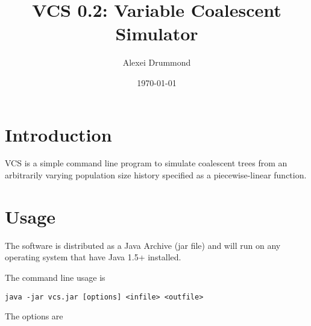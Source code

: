 \documentclass[12pt]{article}
\begin{document}
\title{VCS 0.2: Variable Coalescent Simulator}
\author{Alexei Drummond}
\date{\today{}}
\maketitle

\section*{Introduction}

VCS is a simple command line program to simulate coalescent trees from an arbitrarily varying population size history specified as a piecewise-linear function.

\section*{Usage}

The software is distributed as a Java Archive (jar file) and will run on any operating system that have Java 1.5+ installed.

The command line usage is

\begin{verbatim}
java -jar vcs.jar [options] <infile> <outfile>
\end{verbatim}

The options are
\end{document}
